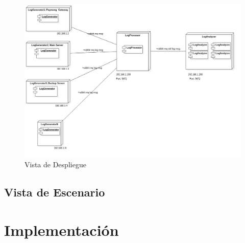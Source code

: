 \documentclass[11pt]{article}
\begin{document}
\begin{landscape}
\begin{center}
 \begin{figure}[H]
 \begin{center}
   \includegraphics[width=20.5cm]{img/physical_view00.png}
   \caption{Vista de Despliegue}
   \label{fig:4plus1views}
 \end{center}
 \end{figure}
\end{center}
\end{landscape}
\restoregeometry

\subsection{Vista de Escenario}

\pagebreak

\section{Implementación}
\end{document}
